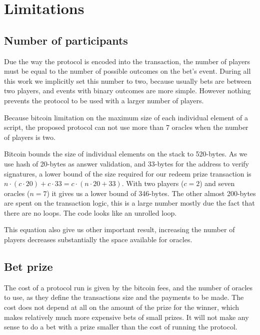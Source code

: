 \section{Limitations}

\subsection{Number of participants}

Due the way the protocol is encoded into the transaction, the number of players
  must be equal to the number of possible outcomes on the bet's event.
During all this work we implicitly set this number to two, because usually bets
  are between two players, and events with binary outcomes are more simple.
However nothing prevents the protocol to be used with a larger number of
  players.

Because bitcoin limitation on the maximum size of each individual element of
  a script, the proposed protocol can not use more than 7 oracles when the
  number of players is two.

Bitcoin bounds the size of individual elements on the stack to 520-bytes.
As we use hash of 20-bytes as answer validation, and 33-bytes for the address
  to verify signatures, a lower bound of the size required for our redeem
  prize transaction is
  $n \cdot (c \cdot 20) + c \cdot 33 = c \cdot (n \cdot 20 + 33)$.
With two players ($c = 2$) and seven oracles ($n = 7$) it gives us a lower
  bound of 346-bytes.
The other almost 200-bytes are spent on the transaction logic, this is
  a large number mostly due the fact that there are no loops. The code
  looks like an unrolled loop.

This equation also give us other important result, increasing the number of
  players decreases substantially the space available for oracles.

\subsection{Bet prize}

The cost of a protocol run is given by the bitcoin fees, and the number
  of oracles to use, as they define the transactions size and the payments
  to be made.
The cost does not depend at all on the amount of the prize for the winner,
  which makes relatively much more expensive bets of small prizes.
It will not make any sense to do a bet with a prize smaller than the cost
  of running the protocol.

